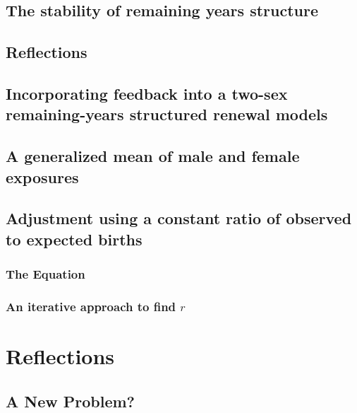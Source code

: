   \section{The stability of remaining years structure}
    
  
  \section{Reflections}
      
        
  
  \section{Incorporating feedback into a two-sex remaining-years structured
  renewal models}

\section{A generalized mean of male and female exposures}
  
\section{Adjustment using a constant ratio of observed to expected births}
  
  \subsection{The Equation}
    
 
  \subsection{An iterative approach to find $r$}
        
      
\chapter{Reflections}
  \section{A New Problem?}
    


